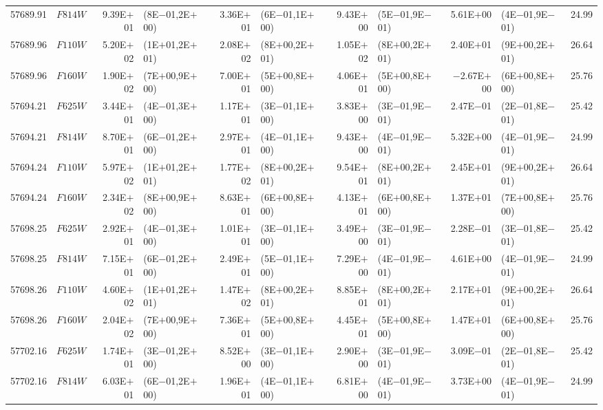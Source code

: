\begin{tabular}{r c r @{\hspace{0.5em}} l r @{\hspace{0.5em}} l r @{\hspace{0.5em}} l r @{\hspace{0.5em}} l r}
57689.91 & $F814W$ & 9.39E$+$01 & (8E$-$01,2E$+$00) & 3.36E$+$01 & (6E$-$01,1E$+$00) & 9.43E$+$00 & (5E$-$01,9E$-$01) & 5.61E$+$00 & (4E$-$01,9E$-$01) & 24.99\\
57689.96 & $F110W$ & 5.20E$+$02 & (1E$+$01,2E$+$01) & 2.08E$+$02 & (8E$+$00,2E$+$01) & 1.05E$+$02 & (8E$+$00,2E$+$01) & 2.40E$+$01 & (9E$+$00,2E$+$01) & 26.64\\
57689.96 & $F160W$ & 1.90E$+$02 & (7E$+$00,9E$+$00) & 7.00E$+$01 & (5E$+$00,8E$+$00) & 4.06E$+$01 & (5E$+$00,8E$+$00) & $-$2.67E$+$00 & (6E$+$00,8E$+$00) & 25.76\\
57694.21 & $F625W$ & 3.44E$+$01 & (4E$-$01,3E$+$00) & 1.17E$+$01 & (3E$-$01,1E$+$00) & 3.83E$+$00 & (3E$-$01,9E$-$01) & 2.47E$-$01 & (2E$-$01,8E$-$01) & 25.42\\
57694.21 & $F814W$ & 8.70E$+$01 & (6E$-$01,2E$+$00) & 2.97E$+$01 & (4E$-$01,1E$+$00) & 9.43E$+$00 & (4E$-$01,9E$-$01) & 5.32E$+$00 & (4E$-$01,9E$-$01) & 24.99\\
57694.24 & $F110W$ & 5.97E$+$02 & (1E$+$01,2E$+$01) & 1.77E$+$02 & (8E$+$00,2E$+$01) & 9.54E$+$01 & (8E$+$00,2E$+$01) & 2.45E$+$01 & (9E$+$00,2E$+$01) & 26.64\\
57694.24 & $F160W$ & 2.34E$+$02 & (8E$+$00,9E$+$00) & 8.63E$+$01 & (6E$+$00,8E$+$00) & 4.13E$+$01 & (6E$+$00,8E$+$00) & 1.37E$+$01 & (7E$+$00,8E$+$00) & 25.76\\
57698.25 & $F625W$ & 2.92E$+$01 & (4E$-$01,3E$+$00) & 1.01E$+$01 & (3E$-$01,1E$+$00) & 3.49E$+$00 & (3E$-$01,9E$-$01) & 2.28E$-$01 & (3E$-$01,8E$-$01) & 25.42\\
57698.25 & $F814W$ & 7.15E$+$01 & (6E$-$01,2E$+$00) & 2.49E$+$01 & (5E$-$01,1E$+$00) & 7.29E$+$00 & (4E$-$01,9E$-$01) & 4.61E$+$00 & (4E$-$01,9E$-$01) & 24.99\\
57698.26 & $F110W$ & 4.60E$+$02 & (1E$+$01,2E$+$01) & 1.47E$+$02 & (8E$+$00,2E$+$01) & 8.85E$+$01 & (8E$+$00,2E$+$01) & 2.17E$+$01 & (9E$+$00,2E$+$01) & 26.64\\
57698.26 & $F160W$ & 2.04E$+$02 & (7E$+$00,9E$+$00) & 7.36E$+$01 & (5E$+$00,8E$+$00) & 4.45E$+$01 & (5E$+$00,8E$+$00) & 1.47E$+$01 & (6E$+$00,8E$+$00) & 25.76\\
57702.16 & $F625W$ & 1.74E$+$01 & (3E$-$01,2E$+$00) & 8.52E$+$00 & (3E$-$01,1E$+$00) & 2.90E$+$00 & (3E$-$01,9E$-$01) & 3.09E$-$01 & (2E$-$01,8E$-$01) & 25.42\\
57702.16 & $F814W$ & 6.03E$+$01 & (6E$-$01,2E$+$00) & 1.96E$+$01 & (4E$-$01,1E$+$00) & 6.81E$+$00 & (4E$-$01,9E$-$01) & 3.73E$+$00 & (4E$-$01,9E$-$01) & 24.99\\

\end{tabular}
